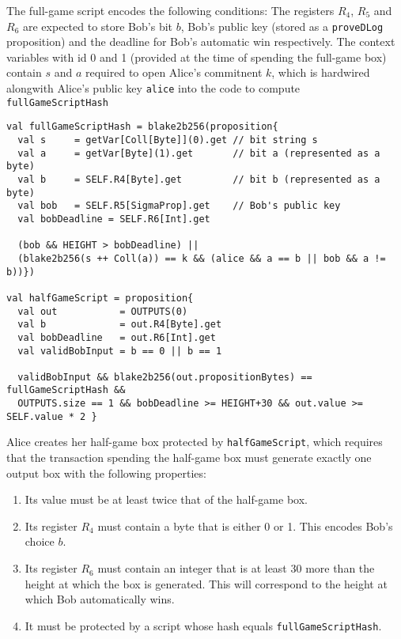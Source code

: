 \documentclass[11pt]{article}
\newcommand{\langname}{ErgoScript\xspace}
\begin{document}
The full-game script encodes the following conditions: The registers $R_4$, $R_5$ and $R_6$ are expected to store Bob's bit $b$, Bob's public key (stored as a \texttt{proveDLog} proposition) and the deadline for Bob's automatic win respectively. The context variables with id 0 and 1 (provided at the time of spending the full-game box) contain $s$ and $a$ required to open Alice's commitnent $k$, which is hardwired alongwith Alice's public key \texttt{alice} into the code to compute \texttt{fullGameScriptHash} 

\begin{verbatim}
val fullGameScriptHash = blake2b256(proposition{
  val s     = getVar[Coll[Byte]](0).get // bit string s
  val a     = getVar[Byte](1).get       // bit a (represented as a byte)
  val b     = SELF.R4[Byte].get         // bit b (represented as a byte)
  val bob   = SELF.R5[SigmaProp].get    // Bob's public key
  val bobDeadline = SELF.R6[Int].get
   
  (bob && HEIGHT > bobDeadline) || 
  (blake2b256(s ++ Coll(a)) == k && (alice && a == b || bob && a != b))})

val halfGameScript = proposition{
  val out           = OUTPUTS(0)
  val b             = out.R4[Byte].get
  val bobDeadline   = out.R6[Int].get
  val validBobInput = b == 0 || b == 1

  validBobInput && blake2b256(out.propositionBytes) == fullGameScriptHash &&
  OUTPUTS.size == 1 && bobDeadline >= HEIGHT+30 && out.value >= SELF.value * 2 }
\end{verbatim}

Alice creates her half-game box protected by \texttt{halfGameScript}, which requires that the transaction spending the half-game box must generate exactly one output box with the following properties:

\begin{enumerate}
	\item Its value must be at least twice that of the half-game box.
	\item Its register $R_4$ must contain a byte that is either 0 or 1. This encodes Bob's choice $b$.
	\item Its register $R_6$ must contain an integer that is at least 30 more than the height at which the box is generated. This will correspond to the height at which Bob automatically wins.
	\item It must be protected by a script whose hash equals \texttt{fullGameScriptHash}.
\end{enumerate}
 
\end{document}
